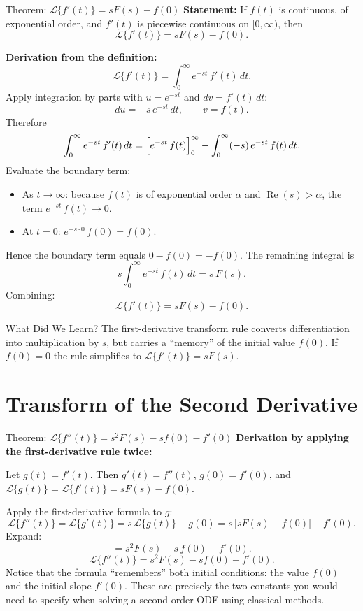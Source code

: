 \documentclass[12pt,a4paper]{article}
\begin{document}
\begin{infobox}{Theorem: \(\mathcal{L}\{f'(t)\} = sF(s) - f(0)\)}
\textbf{Statement:} If \(f(t)\) is continuous, of exponential order, and \(f'(t)\) is piecewise
continuous on \([0,\infty)\), then
\[
  \mathcal{L}\{f'(t)\} = sF(s) - f(0).
\]

\textbf{Derivation from the definition:}
\[
  \mathcal{L}\{f'(t)\} = \int_0^\infty e^{-st}\,f'(t)\,dt.
\]
Apply integration by parts with \(u = e^{-st}\) and \(dv = f'(t)\,dt\):
\[
  du = -s\,e^{-st}\,dt, \qquad v = f(t).
\]
Therefore
\[
  \int_0^\infty e^{-st}\,f'(t)\,dt
  = \Bigl[e^{-st}\,f(t)\Bigr]_0^\infty
    - \int_0^\infty (-s)\,e^{-st}\,f(t)\,dt.
\]
Evaluate the boundary term:
\begin{itemize}
  \item As \(t \to \infty\): because \(f(t)\) is of exponential order \(\alpha\) and
        \(\operatorname{Re}(s) > \alpha\), the term \(e^{-st}\,f(t) \to 0\).
  \item At \(t = 0\): \(e^{-s \cdot 0}\,f(0) = f(0)\).
\end{itemize}
Hence the boundary term equals \(0 - f(0) = -f(0)\).
The remaining integral is
\[
  s\int_0^\infty e^{-st}\,f(t)\,dt = s\,F(s).
\]
Combining:
\[
  \boxed{\mathcal{L}\{f'(t)\} = sF(s) - f(0).}
\]
\end{infobox}

\begin{learnbox}{What Did We Learn?}
The first-derivative transform rule converts differentiation into multiplication by \(s\),
but carries a ``memory'' of the initial value \(f(0)\).
If \(f(0)=0\) the rule simplifies to \(\mathcal{L}\{f'(t)\}=sF(s)\).
\end{learnbox}

\section{Transform of the Second Derivative}

\begin{infobox}{Theorem: \(\mathcal{L}\{f''(t)\} = s^2F(s) - sf(0) - f'(0)\)}
\textbf{Derivation by applying the first-derivative rule twice:}

Let \(g(t) = f'(t)\).
Then \(g'(t) = f''(t)\), \(g(0) = f'(0)\), and
\(\mathcal{L}\{g(t)\} = \mathcal{L}\{f'(t)\} = sF(s) - f(0)\).

Apply the first-derivative formula to \(g\):
\[
  \mathcal{L}\{f''(t)\}
  = \mathcal{L}\{g'(t)\}
  = s\,\mathcal{L}\{g(t)\} - g(0)
  = s\,\bigl[sF(s) - f(0)\bigr] - f'(0).
\]
Expand:
\[
  = s^2F(s) - s\,f(0) - f'(0).
\]
\[
  \boxed{\mathcal{L}\{f''(t)\} = s^2F(s) - sf(0) - f'(0).}
\]
Notice that the formula ``remembers'' both initial conditions: the value \(f(0)\) and the
initial slope \(f'(0)\).
These are precisely the two constants you would need to specify when solving a second-order
ODE using classical methods.
\end{infobox}
\end{document}
